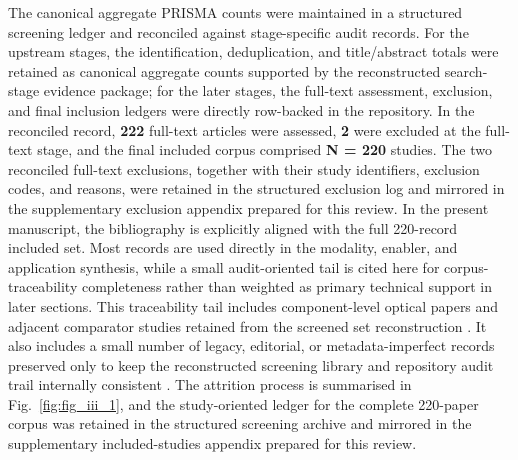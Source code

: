 \documentclass[letterpaper,journal]{IEEEtran}
\begin{document}
The canonical aggregate PRISMA counts were maintained in a structured screening ledger and reconciled against stage-specific audit records. For the upstream stages, the identification, deduplication, and title/abstract totals were retained as canonical aggregate counts supported by the reconstructed search-stage evidence package; for the later stages, the full-text assessment, exclusion, and final inclusion ledgers were directly row-backed in the repository. In the reconciled record, \textbf{222} full-text articles were assessed, \textbf{2} were excluded at the full-text stage, and the final included corpus comprised \textbf{N = 220} studies. The two reconciled full-text exclusions, together with their study identifiers, exclusion codes, and reasons, were retained in the structured exclusion log and mirrored in the supplementary exclusion appendix prepared for this review. In the present manuscript, the bibliography is explicitly aligned with the full 220-record included set. Most records are used directly in the modality, enabler, and application synthesis, while a small audit-oriented tail is cited here for corpus-traceability completeness rather than weighted as primary technical support in later sections. This traceability tail includes component-level optical papers and adjacent comparator studies retained from the screened set reconstruction \cite{O_ISAC_007,O_ISAC_037,O_ISAC_066,O_ISAC_078,O_ISAC_096,O_ISAC_116,O_ISAC_118,O_ISAC_121,O_ISAC_125,O_ISAC_126,O_ISAC_135,O_ISAC_144,O_ISAC_147,O_ISAC_148,O_ISAC_150,O_ISAC_153,O_ISAC_154,O_ISAC_310,O_ISAC_350,O_ISAC_371}. It also includes a small number of legacy, editorial, or metadata-imperfect records preserved only to keep the reconstructed screening library and repository audit trail internally consistent \cite{O_ISAC_146,O_ISAC_149,O_ISAC_158,O_ISAC_165,O_ISAC_167,O_ISAC_172,O_ISAC_173,O_ISAC_185,O_ISAC_186,O_ISAC_189,O_ISAC_347}. The attrition process is summarised in Fig.~\ref{fig:fig_iii_1}, and the study-oriented ledger for the complete 220-paper corpus was retained in the structured screening archive and mirrored in the supplementary included-studies appendix prepared for this review.
\end{document}
